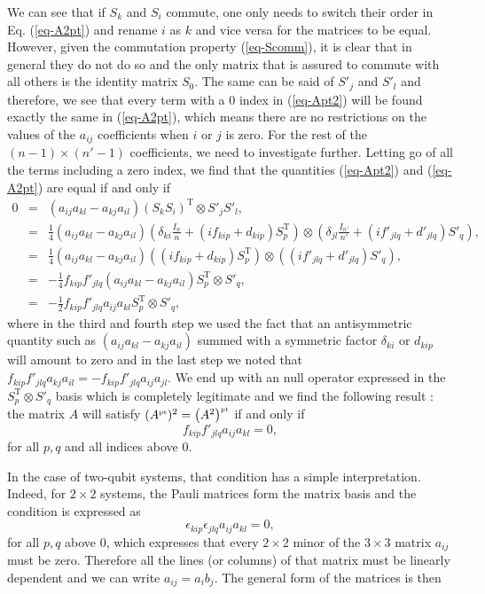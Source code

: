 We can see that if $S_k$ and $S_i$ commute, one only needs to switch their order in Eq. (\ref{eq-A2pt}) and rename $i$ as $k$ and vice versa for the matrices to be equal. However, given the commutation property (\ref{eq-Scomm}), it is clear that in general they do not do so and the only matrix that is assured to commute with all others is the identity matrix $S_0$. The same can be said of $S'_j$ and $S'_l$ and therefore, we see that every term with a $0$ index in (\ref{eq-Apt2}) will be found exactly the same in (\ref{eq-A2pt}), which means there are no restrictions on the values of the $a_{ij}$ coefficients when $i$ or $j$ is zero. For the rest of the $(n-1)\times(n'-1)$ coefficients, we need to investigate  further. Letting go of all the terms including a zero index, we find that the quantities (\ref{eq-Apt2}) and (\ref{eq-A2pt}) are equal if and only if
\begin{eqnarray}
  0 &=& (a_{ij} a_{kl}-a_{kj} a_{il})  (S_k S_i)^{\textrm{T}}  \otimes S'_j S'_l, \\
  &=& \frac 1 4 (a_{ij} a_{kl}-a_{kj} a_{il}) \left( \delta_{ki} \frac{I_n}n + (if_{kip} + d_{kip})S_p^{\textrm{T}}  \right)\otimes \left(\delta_{jl} \frac{I_{n'}}{n'} +(if'_{jlq} + d'_{jlq}) S'_q\right), \nonumber \\
  &=& \frac 1 4 (a_{ij} a_{kl}-a_{kj} a_{il}) \left( (if_{kip} + d_{kip}) S_p^{\textrm{T}} \right)\otimes \left((if'_{jlq} + d'_{jlq}) S'_q\right),\\
  &=&  -\frac 1 4 f_{kip}f'_{jlq}   (a_{ij} a_{kl}-a_{kj} a_{il})  S_p^{\textrm{T}}  \otimes S'_q ,\\
  &=&  -\frac 1 2  f_{kip}f'_{jlq}  a_{ij} a_{kl} S_p^{\textrm{T}}  \otimes S'_q,
\end{eqnarray}
where in the third and fourth step we used the fact that an antisymmetric quantity such as  $(a_{ij} a_{kl}-a_{kj} a_{il})$ summed with a symmetric factor $	\delta_{ki}$ or $d_{kip}$ will amount to zero and in the last step we noted that $f_{kip}f'_{jlq} a_{kj} a_{il}=-f_{kip}f'_{jlq} a_{ij} a_{jl}$. We end up with an null operator expressed in the  $S_p^{\textrm{T}}  \otimes S'_q$ basis which is completely legitimate and we find the following result : the matrix $A$ will satisfy $(A^{\mbox{\tiny \textup{pt}}})^2 = \left(A^2 \right)^{\mbox{\tiny \textup{pt}}}$  if and only if
\[ f_{kip}f'_{jlq}  a_{ij} a_{kl}=0 , \]
for all $p, q$ and all indices above 0.

In the case of two-qubit systems, that condition has a simple interpretation. Indeed, for $2\times 2$ systems, the Pauli matrices form the matrix basis and the condition is expressed as
\[ \epsilon_{kip}\epsilon_{jlq}  a_{ij} a_{kl}=0 , \]
for all $p,q$ above 0, which  expresses that every $2\times 2$ minor of the $3\times 3$ matrix $a_{ij}$ must be zero. Therefore all the lines (or columns) of that matrix must be linearly dependent and we can write $ a_{ij}=a_i b_j$. The general form of the matrices is then

